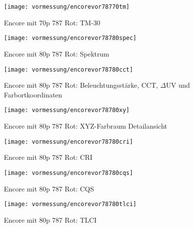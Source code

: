 \documentclass[pagesize,paper=A4,fontsize=12pt,utf8,numbers=noenddot,bibliography=totoc,listof=totoc,DIV=11,BCOR=1mm]{scrreprt}
\begin{document}
\begin{figure}[htp]     %
\centering
\texttt{[image: vormessung/encorevor78770tm]} 
\caption {Encore mit 70p 787 Rot: TM-30} 
\end{figure}




\begin{figure}[htp]     %
\centering
\texttt{[image: vormessung/encorevor78780spec]} 
\caption {Encore mit 80p 787 Rot: Spektrum} 
\end{figure}

\begin{figure}[htp]     %
\centering
\texttt{[image: vormessung/encorevor78780cct]} 
\caption {Encore mit 80p 787 Rot: Beleuchtungsstärke, CCT, $\Delta$UV und Farbortkoordinaten} 
\end{figure}

\begin{figure}[htp]     %
\centering
\texttt{[image: vormessung/encorevor78780xy]} 
\caption {Encore mit 80p 787 Rot: XYZ-Farbraum Detailansicht} 
\end{figure}

\begin{figure}[htp]     %
\centering
\texttt{[image: vormessung/encorevor78780cri]} 
\caption {Encore mit 80p 787 Rot: CRI} 
\end{figure}

\begin{figure}[htp]     %
\centering
\texttt{[image: vormessung/encorevor78780cqs]} 
\caption {Encore mit 80p 787 Rot: CQS} 
\end{figure}

\begin{figure}[htp]     %
\centering
\texttt{[image: vormessung/encorevor78780tlci]} 
\caption {Encore mit 80p 787 Rot: TLCI} 
\end{figure}
\end{document}
